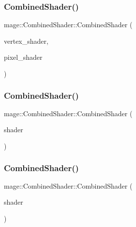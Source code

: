 \subsubsection{\texorpdfstring{Combined\+Shader()}{CombinedShader()}\hspace{0.1cm}{\footnotesize\ttfamily [1/3]}}
{\footnotesize\ttfamily mage\+::\+Combined\+Shader\+::\+Combined\+Shader (\begin{DoxyParamCaption}\item[{\hyperlink{namespacemage_a1e01ae66713838a7a67d30e44c67703e}{Shared\+Ptr}$<$ \hyperlink{classmage_1_1_vertex_shader}{Vertex\+Shader} $>$}]{vertex\+\_\+shader,  }\item[{\hyperlink{namespacemage_a1e01ae66713838a7a67d30e44c67703e}{Shared\+Ptr}$<$ \hyperlink{classmage_1_1_pixel_shader}{Pixel\+Shader} $>$}]{pixel\+\_\+shader }\end{DoxyParamCaption})}

\hypertarget{structmage_1_1_combined_shader_afc4a237b78efe6b13d6e569ede301b62}{}\label{structmage_1_1_combined_shader_afc4a237b78efe6b13d6e569ede301b62} 
\subsubsection{\texorpdfstring{Combined\+Shader()}{CombinedShader()}\hspace{0.1cm}{\footnotesize\ttfamily [2/3]}}
{\footnotesize\ttfamily mage\+::\+Combined\+Shader\+::\+Combined\+Shader (\begin{DoxyParamCaption}\item[{const \hyperlink{structmage_1_1_combined_shader}{Combined\+Shader} \&}]{shader }\end{DoxyParamCaption})\hspace{0.3cm}{\ttfamily [default]}}

\hypertarget{structmage_1_1_combined_shader_a74c1a44f6b1ec3cc1734b18b337441d3}{}\label{structmage_1_1_combined_shader_a74c1a44f6b1ec3cc1734b18b337441d3} 
\subsubsection{\texorpdfstring{Combined\+Shader()}{CombinedShader()}\hspace{0.1cm}{\footnotesize\ttfamily [3/3]}}
{\footnotesize\ttfamily mage\+::\+Combined\+Shader\+::\+Combined\+Shader (\begin{DoxyParamCaption}\item[{\hyperlink{structmage_1_1_combined_shader}{Combined\+Shader} \&\&}]{shader }\end{DoxyParamCaption})\hspace{0.3cm}{\ttfamily [default]}}

